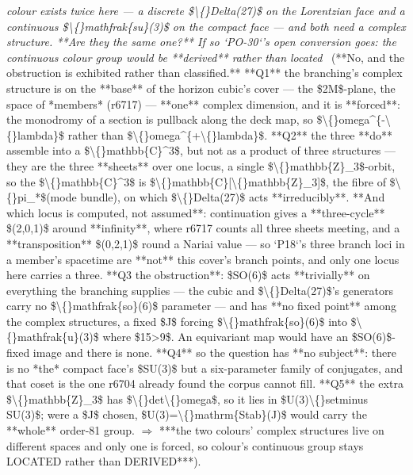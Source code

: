\begin{description}
\textit{colour exists twice here --- a discrete \$\textbackslash\{\}Delta(27)\$ on the Lorentzian face and a continuous \$\textbackslash\{\}mathfrak\{su\}(3)\$ on the compact face --- and both need a complex structure. **Are they the same one?** If so `PO-30`'s open conversion goes: the continuous colour group would be **derived** rather than located} \ (**No, and the obstruction is exhibited rather than classified.**  **Q1** the branching's complex structure is on the **base** of the horizon cubic's cover --- the \$2M\$-plane, the space of *members* (r6717) --- **one** complex dimension, and it is **forced**: the monodromy of a section is pullback along the deck map, so \$\textbackslash\{\}omega\textasciicircum{}\{-\textbackslash\{\}lambda\}\$ rather than \$\textbackslash\{\}omega\textasciicircum{}\{+\textbackslash\{\}lambda\}\$.  **Q2** the three **do** assemble into a \$\textbackslash\{\}mathbb\{C\}\textasciicircum{}3\$, but not as a product of three structures --- they are the three **sheets** over one locus, a single \$\textbackslash\{\}mathbb\{Z\}\_3\$-orbit, so the \$\textbackslash\{\}mathbb\{C\}\textasciicircum{}3\$ is \$\textbackslash\{\}mathbb\{C\}[\textbackslash\{\}mathbb\{Z\}\_3]\$, the fibre of \$\textbackslash\{\}pi\_*\$(mode bundle), on which \$\textbackslash\{\}Delta(27)\$ acts **irreducibly**.  **And which locus is computed, not assumed**: continuation gives a **three-cycle** \$(2,0,1)\$ around **infinity**, where r6717 counts all three sheets meeting, and a **transposition** \$(0,2,1)\$ round a Nariai value --- so `P18`'s three branch loci in a member's spacetime are **not** this cover's branch points, and only one locus here carries a three.  **Q3 the obstruction**: \$SO(6)\$ acts **trivially** on everything the branching supplies --- the cubic and \$\textbackslash\{\}Delta(27)\$'s generators carry no \$\textbackslash\{\}mathfrak\{so\}(6)\$ parameter --- and has **no fixed point** among the complex structures, a fixed \$J\$ forcing \$\textbackslash\{\}mathfrak\{so\}(6)\$ into \$\textbackslash\{\}mathfrak\{u\}(3)\$ where \$15>9\$. An equivariant map would have an \$SO(6)\$-fixed image and there is none.  **Q4** so the question has **no subject**: there is no *the* compact face's \$SU(3)\$ but a six-parameter family of conjugates, and that coset is the one r6704 already found the corpus cannot fill.  **Q5** the extra \$\textbackslash\{\}mathbb\{Z\}\_3\$ has \$\textbackslash\{\}det\textbackslash\{\}omega\$, so it lies in \$U(3)\textbackslash\{\}setminus SU(3)\$; were a \$J\$ chosen, \$U(3)=\textbackslash\{\}mathrm\{Stab\}(J)\$ would carry the **whole** order-81 group. \ensuremath{\Rightarrow} ***the two colours' complex structures live on different spaces and only one is forced, so colour's continuous group stays LOCATED rather than DERIVED***). 

\end{description}
